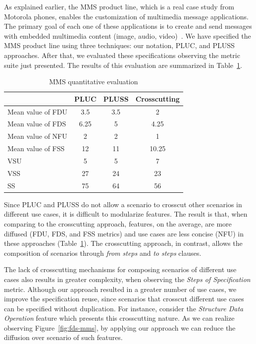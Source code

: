 \documentclass{acm_proc_article-sp}
\begin{document}
As explained earlier, the MMS product line, which is a real case study from Motorola phones, enables the customization of 
multimedia message applications. The primary goal of each one of these applications is to create and 
send messages with embedded multimedia content (image, audio, video)~\cite{rbonifacio-ea-2008}. 
We have specified the MMS product line using three techniques: our notation, PLUC, and PLUSS approaches. After that, we evaluated these specifications observing the metric suite just presented. The results of this evaluation are summarized in Table~\ref{tab:metrics}. 

\begin{table}[htb]
\centering
\caption{MMS quantitative evaluation}
\label{tab:metrics}
\begin{small}
\begin{tabular}{lccc} \hline
					& PLUC 	& PLUSS 	& Crosscutting	\\ \hline
Mean value of FDU 		& 3.5	& 3.5	& 2		\\
Mean value of FDS 		& 6.25	& 5		& 4.25	\\
Mean value of NFU 		& 2		& 2		& 1		\\
Mean value of FSS 		&12		& 11		& 10.25	\\ 
VSU 					& 5		& 5		& 7		\\
VSS 					& 27		& 24		& 23		\\
SS 					& 75		& 64		& 56		\\	\hline
\end{tabular}
\end{small}
\end{table}

Since PLUC and PLUSS do not allow a
scenario to crosscut other scenarios in different use cases, it
is difficult to modularize features. The
result is that, when comparing to the crosscutting approach,
features, on the average,  are more 
diffused (FDU, FDS, and FSS metrics) and use cases are
less concise (NFU) in these approaches (Table~\ref{tab:metrics}). The crosscutting
approach, in contrast, allows the composition of scenarios
through \emph{from steps} and \emph{to steps} clauses. 

The lack of crosscutting mechanisms for composing scenarios of different use cases also results in greater complexity, when observing the \emph{Steps of Specification} metric. Although our approach resulted in a greater number of use cases, we improve the specification reuse, since scenarios that crosscut different use cases can be specified without duplication. For instance, consider the \emph{Structure Data Operation} feature which presents this crosscutting nature. As we can realize observing Figure~\ref{fig:fds-mms}, by applying our approach we can reduce the diffusion over scenario of such features.
\end{document}
